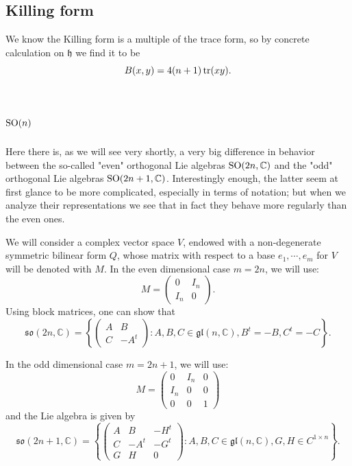 \documentclass{report}
\begin{document}
\subsection{Killing form}
We know the Killing form is a multiple of the trace form, so by concrete calculation on $\mathfrak{h}$ we find it to be
\[
B(x,y) = 4(n+1)\operatorname{tr}(xy).
\]

\section{$\operatorname{{\mathrm{SO}}}(n)$}
Here there is, as we will see very shortly, a very big difference in behavior
between the so-called "even" orthogonal Lie algebras $\operatorname{{\mathrm{SO}}}(2n, \mathbb C)$ and the "odd"
orthogonal Lie algebras $\operatorname{{\mathrm{SO}}}(2n+1, \mathbb C)$. 
Interestingly enough, the latter seem at first glance to be more complicated, especially in terms of notation; but when we analyze their representations we see that in fact they behave more regularly than the even ones.

We will consider a complex vector space $V$, endowed with a non-degenerate symmetric bilinear form $Q$, whose matrix with respect to a base $e_1, \cdots, e_m$ for $V$ will be denoted with $M$.
In the even dimensional case $m = 2n$, we will use:
\[
M = \begin{pmatrix}
    0 & I_n\\
    I_n & 0
\end{pmatrix}.
\]
Using block matrices, one can show that
\[
\mathfrak{so}(2n, \mathbb C) = \left\{ \begin{pmatrix}
    A & B\\
    C & -A^t
\end{pmatrix}: A, B,C \in \mathfrak{gl}(n, \mathbb C), B^t = -B, C^t = -C
\right\}.
\]

In the odd dimensional case $m = 2n+1$, we will use:
\[
M = \begin{pmatrix}
    0 & I_n & 0\\
    I_n & 0 & 0\\
    0 & 0 & 1
\end{pmatrix}
\]
and the Lie algebra is given by
\[
\mathfrak{so}(2n+1, \mathbb C) = \left\{
    \begin{pmatrix}
        A & B & -H^t\\
        C & -A^t & -G^t\\
        G & H & 0
    \end{pmatrix}: A, B, C \in \mathfrak{gl}(n, \mathbb C), G,H \in C^{1 \times n}
\right\}.
\]
\end{document}
